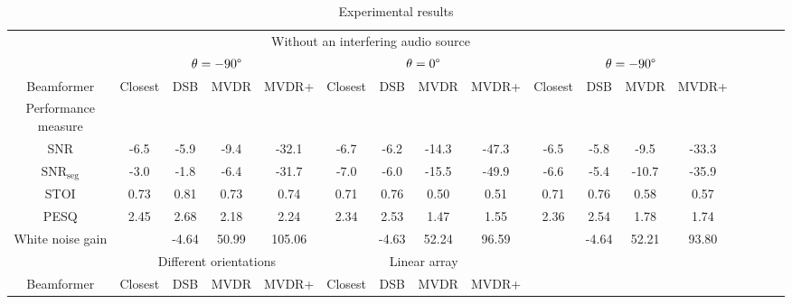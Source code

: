 \begin{sidewaystable}[h]
\centering

\caption{Experimental results}
\label{tab:expRes}
  \begin{adjustbox}{max width=\textwidth}
\begin{tabular}{|c|c|c|c|c|c|c|c|c|c|c|c|c|c|c|c|c|}
\hline
\multicolumn{13}{|c|}{\multirow{2}{*}{Without an interfering audio source}} \\ 
\multicolumn{13}{|c|}{} \\ \hline

						& \multicolumn{4}{c|}{$\theta = -90\degree$}	& \multicolumn{4}{c|}{$\theta = 0\degree$} 	& \multicolumn{4}{c|}{$\theta = -90\degree$} \\ \hline
	
Beamformer				& Closest  	& DSB 	& MVDR 	& MVDR+ 		& Closest  	& DSB 	& MVDR 	& MVDR+ 		& Closest  	& DSB 	& MVDR 	& MVDR+ \\ \hline
				
Performance measure 	& 			& 		&   	&   			& 	 		&   	& 	 	&   			& 			& 		&  		&  \\
				
SNR 					& -6.5		& -5.9	& -9.4 	& -32.1 		& -6.7 		& -6.2 	& -14.3 & -47.3 		& -6.5		& -5.8	& -9.5 	& -33.3 \\
						
$\text{SNR}_\text{seg}$	& -3.0		& -1.8	& -6.4 	& -31.7 		& -7.0 		& -6.0 	& -15.5 & -49.9 		& -6.6		& -5.4	& -10.7	& -35.9 \\
						
STOI   					& 0.73		& 0.81	& 0.73	& 0.74 			& 0.71 		& 0.76 	& 0.50 	& 0.51  		& 0.71		& 0.76	& 0.58 	& 0.57 	\\
						
PESQ  					& 2.45		& 2.68	& 2.18 	& 2.24 			& 2.34 		& 2.53 	& 1.47 	& 1.55  		& 2.36		& 2.54	& 1.78 	& 1.74	\\
						
White noise gain 		& 			& -4.64	& 50.99 & 105.06 		&   		& -4.63 & 52.24 & 96.59 		& 			& -4.64	& 52.21 & 93.80 \\ \hline

						& \multicolumn{4}{c|}{Different orientations}& \multicolumn{4}{c|}{Linear array}  		\\ \cline{1-9}

Beamformer				& Closest  	& DSB 	& MVDR 	& MVDR+ 		& Closest  	& DSB 	& MVDR 		& MVDR+ 	\\ \cline{1-9}
	

\end{tabular}
\end{adjustbox}
\end{sidewaystable}
